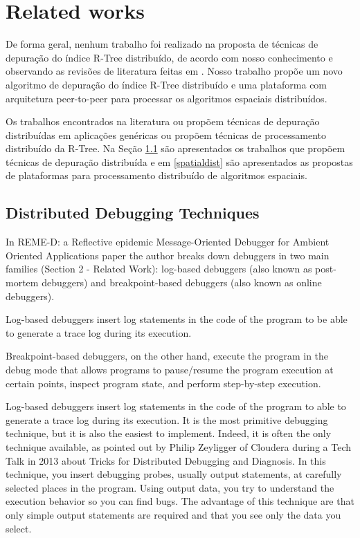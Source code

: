 \section{Related works}
\label{sec:related}

De forma geral, nenhum trabalho foi realizado na proposta de técnicas de depuração do índice R-Tree distribuído, de acordo com nosso conhecimento e observando as revisões de literatura feitas em \cite{manolopoulos2003rth,jacox2007spatial}.
Nosso trabalho propõe um novo algoritmo de depuração do índice R-Tree distribuído e uma plataforma com arquitetura peer-to-peer para processar os algoritmos espaciais distribuídos.

Os trabalhos encontrados na literatura ou propõem técnicas de depuração distribuídas em aplicações genéricas ou propõem técnicas de processamento distribuído da R-Tree. Na Seção \ref{dist_debug} são apresentados os trabalhos que propõem técnicas de depuração distribuída e em \ref{spatialdist} são apresentados as propostas de plataformas para processamento distribuído de algoritmos espaciais.
	
\subsection{Distributed Debugging Techniques}
\label{dist_debug}

In REME-D: a Reflective epidemic Message-Oriented Debugger for Ambient Oriented Applications paper the author breaks down debuggers in two main families (Section 2 - Related Work): log-based debuggers (also known as post-mortem debuggers) and breakpoint-based debuggers (also known as online debuggers).

	Log-based debuggers insert log statements in the code of the program to be able to generate a trace log during its execution.
	
	Breakpoint-based debuggers, on the other hand, execute the program in the debug mode that allows programs to pause/resume the program execution at certain points, inspect program state, and perform step-by-step execution.

	Log-based debuggers insert log statements in the code of the program to able to generate a trace log during its execution. It is the most primitive debugging technique, but it is also the easiest to implement. Indeed, it is often the only technique available, as pointed out by Philip Zeyligger of Cloudera during a Tech Talk in 2013 about Tricks for Distributed Debugging and Diagnosis. In this technique, you insert debugging probes, usually output statements, at carefully selected places in the program. Using output data, you try to understand the execution behavior so you can find bugs. The advantage of this technique are that only simple output statements are required and that you see only the data you select.
	
